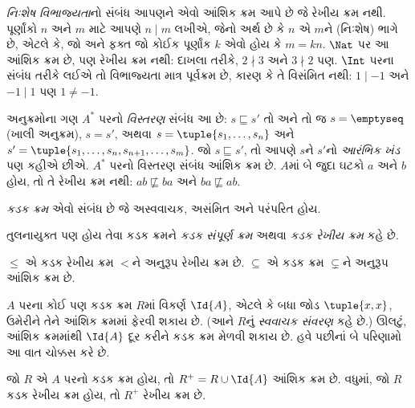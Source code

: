 \documentclass[../../../include/open-logic-section]{subfiles}
\begin{document}
\begin{ex}
\emph{નિઃશેષ વિભાજ્યતા}નો સંબંધ આપણને એવો આંશિક ક્રમ આપે છે
જે રેખીય ક્રમ નથી. પૂર્ણાંકો $n$ અને $m$ માટે આપણે $n \mid m$
લખીએ, જેનો અર્થ છે કે $n$ એ $m$ને (નિઃશેષ) ભાગે છે,
એટલે કે, જો અને ફક્ત જો કોઈક પૂર્ણાંક $k$ એવો હોય કે
$m = kn$. $\Nat$ પર આ આંશિક ક્રમ છે, પણ રેખીય ક્રમ નથી:
દાખલા તરીકે, $2 \nmid 3$ અને $3 \nmid 2$ પણ.
$\Int$ પરના સંબંધ તરીકે લઈએ તો વિભાજ્યતા માત્ર પૂર્વક્રમ છે,
કારણ કે તે વિસંમિત નથી: $1 \mid -1$ અને $-1 \mid 1$
પણ $1 \neq -1$.
\end{ex}

\begin{ex}
અનુક્રમોના ગણ $A^*$ પરનો \emph{વિસ્તરણ} સંબંધ આ છે:
$s \sqsubseteq s'$ તો અને તો જ $s = \emptyseq$ (ખાલી અનુક્રમ),
$s = s'$, અથવા $s = \tuple{s_1, \dots, s_n}$ અને
$s' = \tuple{s_1, \dots, s_n, s_{n+1}, \dots, s_m}$.
જો $s \sqsubseteq s'$, તો આપણે $s$ને $s'$નો
\emph{આરંભિક ખંડ} પણ કહીએ છીએ.
$A^*$ પરનો વિસ્તરણ સંબંધ આંશિક ક્રમ છે. $A$માં બે જુદા
ઘટકો $a$ અને $b$ હોય, તો તે રેખીય ક્રમ નથી:
$ab \not\sqsubseteq ba$ અને $ba \not\sqsubseteq ab$.
\end{ex}

\begin{defn}[કડક ક્રમ]
\emph{કડક ક્રમ} એવો સંબંધ છે જે અસ્વવાચક, અસંમિત અને પરંપરિત હોય.
\end{defn}

\begin{defn}[કડક રેખીય ક્રમ]
તુલનાયુક્ત પણ હોય તેવા કડક ક્રમને \emph{કડક સંપૂર્ણ ક્રમ}
અથવા \emph{કડક રેખીય ક્રમ} કહે છે.
\end{defn}

\begin{ex}
$\le$ એ કડક રેખીય ક્રમ $<$ને અનુરૂપ રેખીય ક્રમ છે.
$\subseteq$ એ કડક ક્રમ $\subsetneq$ને અનુરૂપ આંશિક ક્રમ છે.
\end{ex}

$A$ પરના કોઈ પણ કડક ક્રમ $R$માં વિકર્ણ $\Id{A}$,
એટલે કે બધા જોડ $\tuple{x, x}$, ઉમેરીને તેને આંશિક ક્રમમાં
ફેરવી શકાય છે. (આને $R$નું \emph{સ્વવાચક સંવરણ} કહે છે.)
ઊલટું, આંશિક ક્રમમાંથી $\Id{A}$ દૂર કરીને કડક ક્રમ મેળવી શકાય છે.
હવે પછીનાં બે પરિણામો આ વાત ચોક્કસ કરે છે.

\begin{prop}
જો $R$ એ $A$ પરનો કડક ક્રમ હોય, તો $R^+ = R \cup \Id{A}$
આંશિક ક્રમ છે. વધુમાં, જો $R$ કડક રેખીય ક્રમ હોય, તો
$R^+$ રેખીય ક્રમ છે.
\end{prop}
\end{document}

